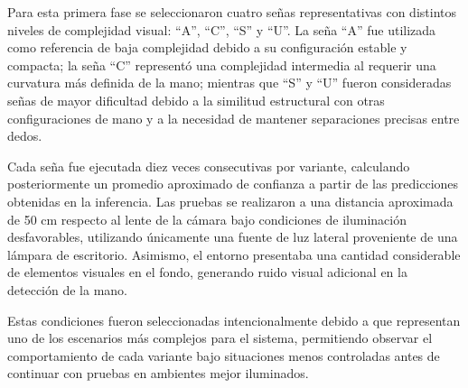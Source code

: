 	Para esta primera fase se seleccionaron cuatro señas representativas con distintos niveles de complejidad visual: ``A'', ``C'', ``S'' y ``U''. La seña ``A'' fue utilizada como referencia de baja complejidad debido a su configuración estable y compacta; la seña ``C'' representó una complejidad intermedia al requerir una curvatura más definida de la mano; mientras que ``S'' y ``U'' fueron consideradas señas de mayor dificultad debido a la similitud estructural con otras configuraciones de mano y a la necesidad de mantener separaciones precisas entre dedos.
	
	Cada seña fue ejecutada diez veces consecutivas por variante, calculando posteriormente un promedio aproximado de confianza a partir de las predicciones obtenidas en la inferencia. Las pruebas se realizaron a una distancia aproximada de 50 cm respecto al lente de la cámara bajo condiciones de iluminación desfavorables, utilizando únicamente una fuente de luz lateral proveniente de una lámpara de escritorio. Asimismo, el entorno presentaba una cantidad considerable de elementos visuales en el fondo, generando ruido visual adicional en la detección de la mano.
	
	Estas condiciones fueron seleccionadas intencionalmente debido a que representan uno de los escenarios más complejos para el sistema, permitiendo observar el comportamiento de cada variante bajo situaciones menos controladas antes de continuar con pruebas en ambientes mejor iluminados.
	
	
	\small
	\renewcommand{\arraystretch}{1.15}
	
